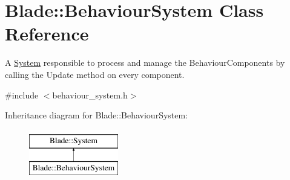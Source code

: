 \hypertarget{class_blade_1_1_behaviour_system}{}\section{Blade\+:\+:Behaviour\+System Class Reference}
\label{class_blade_1_1_behaviour_system}


A \hyperlink{class_blade_1_1_system}{System} responsible to process and manage the Behaviour\+Components by calling the Update method on every component.  




{\ttfamily \#include $<$behaviour\+\_\+system.\+h$>$}

Inheritance diagram for Blade\+:\+:Behaviour\+System\+:\begin{figure}[H]
\begin{center}
\leavevmode
\includegraphics[height=2.000000cm]{class_blade_1_1_behaviour_system}
\end{center}
\end{figure}
